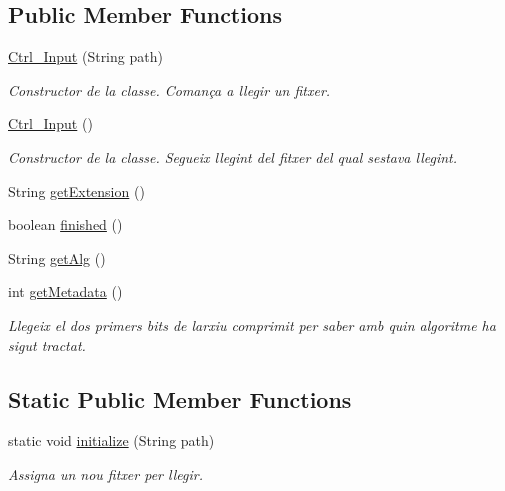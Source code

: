 \subsection*{Public Member Functions}
\begin{DoxyCompactItemize}
\item 
\hyperlink{classpersistencia_1_1input_1_1Ctrl__Input_a00f3fa14d0329d6e4b9ddbe39ada1258}{Ctrl\+\_\+\+Input} (String path)
\begin{DoxyCompactList}\small\item\em Constructor de la classe. Comança a llegir un fitxer. \end{DoxyCompactList}\item 
\hyperlink{classpersistencia_1_1input_1_1Ctrl__Input_a817ed61e715eb12261d844de34d84bec}{Ctrl\+\_\+\+Input} ()
\begin{DoxyCompactList}\small\item\em Constructor de la classe. Segueix llegint del fitxer del qual s\textquotesingle{}estava llegint. \end{DoxyCompactList}\item 
String \hyperlink{classpersistencia_1_1input_1_1Ctrl__Input_a46d569c2f3ceb0ab6cf9900708b3316a}{get\+Extension} ()
\item 
boolean \hyperlink{classpersistencia_1_1input_1_1Ctrl__Input_a5a94d207dce0fd592b5ac17f55154d4f}{finished} ()
\item 
String \hyperlink{classpersistencia_1_1input_1_1Ctrl__Input_aa69f79fb581f6d80c5a9609148794570}{get\+Alg} ()
\item 
int \hyperlink{classpersistencia_1_1input_1_1Ctrl__Input_a46e05fce164a6803820c02565c1769c8}{get\+Metadata} ()
\begin{DoxyCompactList}\small\item\em Llegeix el dos primers bits de l\textquotesingle{}arxiu comprimit per saber amb quin algoritme ha sigut tractat. \end{DoxyCompactList}\end{DoxyCompactItemize}
\subsection*{Static Public Member Functions}
\begin{DoxyCompactItemize}
\item 
static void \hyperlink{classpersistencia_1_1input_1_1Ctrl__Input_a0b62b5bc05ac4a7fd919a49b201eb4fd}{initialize} (String path)
\begin{DoxyCompactList}\small\item\em Assigna un nou fitxer per llegir. \end{DoxyCompactList}\end{DoxyCompactItemize}
